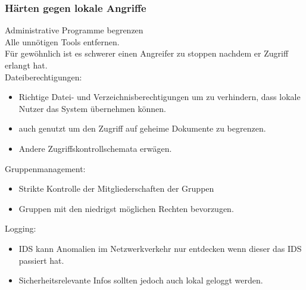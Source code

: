 \documentclass{article} %
\begin{document}
\subsubsection{Härten gegen lokale Angriffe}
Administrative Programme begrenzen\\
Alle unnötigen Tools entfernen.\\
Für gewöhnlich ist es schwerer einen Angreifer zu stoppen nachdem er Zugriff erlangt hat.\\
Dateiberechtigungen:
\begin{itemize}
	\item Richtige Datei- und Verzeichnisberechtigungen um zu verhindern, dass lokale Nutzer das System übernehmen können.
    \item auch genutzt um den Zugriff auf geheime Dokumente zu begrenzen.
    \item Andere Zugriffskontrollschemata erwägen.
\end{itemize}
Gruppenmanagement:
\begin{itemize}
	\item Strikte Kontrolle der Mitgliederschaften der Gruppen
    \item Gruppen mit den niedrigst möglichen Rechten bevorzugen.
\end{itemize}
Logging:
\begin{itemize}
	\item IDS kann Anomalien im Netzwerkverkehr nur entdecken wenn dieser das IDS passiert hat.
    \item Sicherheitsrelevante Infos sollten jedoch auch lokal geloggt werden.
\end{itemize}
\end{document}
